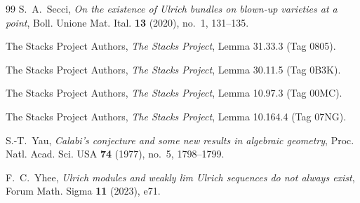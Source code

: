 \documentclass[11pt]{article}
\begin{document}
\begin{thebibliography}{99}
S.~A.~Secci,
\emph{On the existence of Ulrich bundles on blown-up varieties at a point},
Boll. Unione Mat. Ital. \textbf{13} (2020), no.~1, 131--135.

The Stacks Project Authors,
\emph{The Stacks Project}, Lemma 31.33.3 (Tag 0805).

The Stacks Project Authors,
\emph{The Stacks Project}, Lemma 30.11.5 (Tag 0B3K).

The Stacks Project Authors,
\emph{The Stacks Project}, Lemma 10.97.3 (Tag 00MC).

The Stacks Project Authors,
\emph{The Stacks Project}, Lemma 10.164.4 (Tag 07NG).

S.-T.~Yau,
\emph{Calabi's conjecture and some new results in algebraic geometry},
Proc. Natl. Acad. Sci. USA \textbf{74} (1977), no.~5, 1798--1799.

F.~C.~Yhee,
\emph{Ulrich modules and weakly lim Ulrich sequences do not always exist},
Forum Math. Sigma \textbf{11} (2023), e71.

\end{thebibliography}
\end{document}
